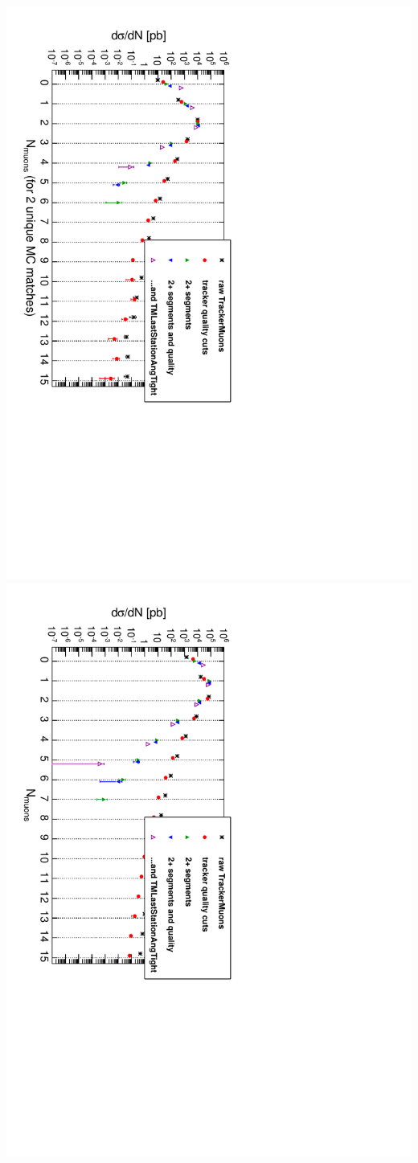 \documentclass[compress]{beamer}
\begin{document}
\begin{frame}
\includegraphics[height=0.45\linewidth, angle=90]{tracks_cuts_2real.pdf}
\includegraphics[height=0.45\linewidth, angle=90]{tracks_cuts_allreal.pdf}
\end{frame}
\end{document}
